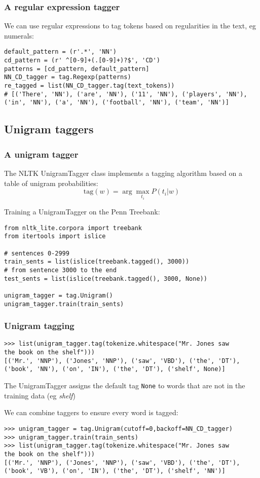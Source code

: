 \documentclass{beamer}             %
\begin{document}
\begin{frame}[fragile]
  \frametitle{A regular expression tagger}
We can use regular expressions to tag tokens based on regularities in
the text, eg numerals:

{\small
\begin{verbatim}
default_pattern = (r'.*', 'NN')
cd_pattern = (r' ^[0-9]+(.[0-9]+)?$', 'CD')
patterns = [cd_pattern, default_pattern]
NN_CD_tagger = tag.Regexp(patterns)
re_tagged = list(NN_CD_tagger.tag(text_tokens))
# [('There', 'NN'), ('are', 'NN'), ('11', 'NN'), ('players', 'NN'), 
('in', 'NN'), ('a', 'NN'), ('football', 'NN'), ('team', 'NN')]
\end{verbatim}
}%
\end{frame}



\subsection{Unigram taggers} 

\begin{frame}[fragile]
  \frametitle{A unigram tagger}
The NLTK UnigramTagger class implements a tagging algorithm based on a
table of unigram probabilities:
\[ \mbox{tag}(w) = \arg\max_{t_i} P(t_i|w) \]

\pause
Training a UnigramTagger on the Penn Treebank:
{\small
\begin{verbatim}
from nltk_lite.corpora import treebank
from itertools import islice

# sentences 0-2999
train_sents = list(islice(treebank.tagged(), 3000))
# from sentence 3000 to the end
test_sents = list(islice(treebank.tagged(), 3000, None))

unigram_tagger = tag.Unigram()
unigram_tagger.train(train_sents)
\end{verbatim}}
\end{frame}



\begin{frame}[fragile]
  \frametitle{Unigram tagging}
{\small
\begin{verbatim}
>>> list(unigram_tagger.tag(tokenize.whitespace("Mr. Jones saw 
the book on the shelf")))
[('Mr.', 'NNP'), ('Jones', 'NNP'), ('saw', 'VBD'), ('the', 'DT'), 
('book', 'NN'), ('on', 'IN'), ('the', 'DT'), ('shelf', None)]
\end{verbatim}}

  The UnigramTagger assigns the default tag \texttt{None} to words
  that are not in the training data (eg \emph{shelf})

  \pause
  We can combine taggers to ensure every word is tagged:
{\small
\begin{verbatim}
>>> unigram_tagger = tag.Unigram(cutoff=0,backoff=NN_CD_tagger)
>>> unigram_tagger.train(train_sents)
>>> list(unigram_tagger.tag(tokenize.whitespace("Mr. Jones saw 
the book on the shelf")))
[('Mr.', 'NNP'), ('Jones', 'NNP'), ('saw', 'VBD'), ('the', 'DT'), 
('book', 'VB'), ('on', 'IN'), ('the', 'DT'), ('shelf', 'NN')]
\end{verbatim}}
\end{frame}
\end{document}
